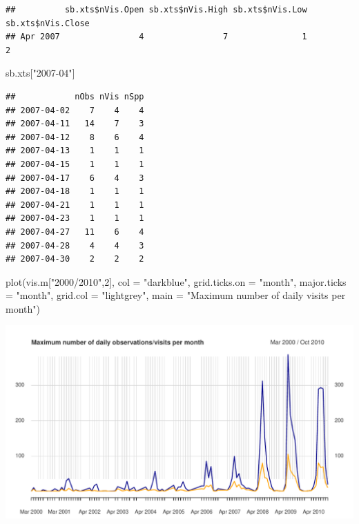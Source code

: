 \documentclass[
  10pt,
]{article}
\newenvironment{Shaded}{\begin{snugshade}}{\end{snugshade}}
\newcommand{\AttributeTok}[1]{\textcolor[rgb]{0.77,0.63,0.00}{#1}}
\newcommand{\DecValTok}[1]{\textcolor[rgb]{0.00,0.00,0.81}{#1}}
\newcommand{\FunctionTok}[1]{\textcolor[rgb]{0.00,0.00,0.00}{#1}}
\newcommand{\NormalTok}[1]{#1}
\newcommand{\StringTok}[1]{\textcolor[rgb]{0.31,0.60,0.02}{#1}}
\begin{document}
\begin{verbatim}
##          sb.xts$nVis.Open sb.xts$nVis.High sb.xts$nVis.Low sb.xts$nVis.Close
## Apr 2007                4                7               1                 2
\end{verbatim}

\begin{Shaded}
\begin{Highlighting}[]
\NormalTok{sb.xts[}\StringTok{"2007{-}04"}\NormalTok{]}
\end{Highlighting}
\end{Shaded}

\begin{verbatim}
##            nObs nVis nSpp
## 2007-04-02    7    4    4
## 2007-04-11   14    7    3
## 2007-04-12    8    6    4
## 2007-04-13    1    1    1
## 2007-04-15    1    1    1
## 2007-04-17    6    4    3
## 2007-04-18    1    1    1
## 2007-04-21    1    1    1
## 2007-04-23    1    1    1
## 2007-04-27   11    6    4
## 2007-04-28    4    4    3
## 2007-04-30    2    2    2
\end{verbatim}

\begin{Shaded}
\begin{Highlighting}[]
\FunctionTok{plot}\NormalTok{(vis.m[}\StringTok{"2000/2010"}\NormalTok{,}\DecValTok{2}\NormalTok{], }\AttributeTok{col =} \StringTok{"darkblue"}\NormalTok{, }\AttributeTok{grid.ticks.on =} \StringTok{"month"}\NormalTok{, }
     \AttributeTok{major.ticks =} \StringTok{"month"}\NormalTok{, }\AttributeTok{grid.col =} \StringTok{"lightgrey"}\NormalTok{, }
     \AttributeTok{main =} \StringTok{"Maximum number of daily visits per month"}\NormalTok{)}
\end{Highlighting}
\end{Shaded}

\includegraphics{r-tools-tutorial_files/figure-latex/monthly and plot-2.pdf}
\end{document}

